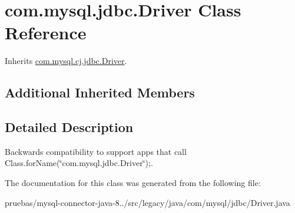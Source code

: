 \hypertarget{classcom_1_1mysql_1_1jdbc_1_1_driver}{}\section{com.\+mysql.\+jdbc.\+Driver Class Reference}
\label{classcom_1_1mysql_1_1jdbc_1_1_driver}


Inherits \mbox{\hyperlink{classcom_1_1mysql_1_1cj_1_1jdbc_1_1_driver}{com.\+mysql.\+cj.\+jdbc.\+Driver}}.

\subsection*{Additional Inherited Members}


\subsection{Detailed Description}
Backwards compatibility to support apps that call {\ttfamily Class.\+for\+Name(\char`\"{}com.\+mysql.\+jdbc.\+Driver\char`\"{});}. 

The documentation for this class was generated from the following file\+:\begin{DoxyCompactItemize}
\item 
pruebas/mysql-\/connector-\/java-\/8../src/legacy/java/com/mysql/jdbc/Driver.\+java\end{DoxyCompactItemize}
